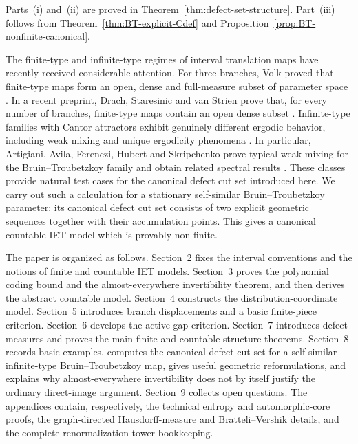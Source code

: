 \documentclass[11pt]{amsart}
\theoremstyle{plain}
\theoremstyle{definition}
\theoremstyle{remark}
\begin{document}
Parts~\textup{(i)} and~\textup{(ii)} are proved in
Theorem~\ref{thm:defect-set-structure}. Part~\textup{(iii)} follows from
Theorem~\ref{thm:BT-explicit-Cdef} and
Proposition~\ref{prop:BT-nonfinite-canonical}.

The finite-type and infinite-type regimes of interval translation maps have recently received
considerable attention. For three branches, Volk proved that finite-type maps form an open,
dense and full-measure subset of parameter space \cite{Volk2014}. In a recent preprint,
Drach, Staresinic and van Strien prove that, for every number of branches, finite-type maps
contain an open dense subset \cite{DrachStaresinicVanStrien2026}. Infinite-type families with
Cantor attractors exhibit genuinely different ergodic behavior, including weak mixing and
unique ergodicity phenomena \cite{BruinRadinger2026,SkripchenkoChernyi2026}. In particular,
Artigiani, Avila, Ferenczi, Hubert and Skripchenko prove typical weak mixing for the
Bruin--Troubetzkoy family and obtain related spectral results
\cite{ArtigianiAvilaFerencziHubertSkripchenko2026}. These classes provide natural test cases
for the canonical defect cut set introduced here. We carry out such a calculation for a
stationary self-similar Bruin--Troubetzkoy parameter: its canonical defect cut set consists of
two explicit geometric sequences together with their accumulation points. This gives a
canonical countable IET model which is provably non-finite.

The paper is organized as follows. Section~2 fixes the interval conventions and the notions
of finite and countable IET models. Section~3 proves the polynomial coding
bound and the almost-everywhere invertibility theorem, and then derives the abstract countable
model. Section~4 constructs the distribution-coordinate model. Section~5 introduces branch
displacements and a basic finite-piece criterion. Section~6 develops the active-gap criterion.
Section~7 introduces defect measures and proves the main finite and countable structure
theorems. Section~8 records basic examples, computes the canonical defect cut set for a
self-similar infinite-type Bruin--Troubetzkoy map, gives useful geometric reformulations,
and explains why almost-everywhere invertibility does not by itself justify the ordinary
direct-image argument. Section~9 collects open questions. The appendices contain,
respectively, the technical entropy and automorphic-core proofs, the graph-directed
Hausdorff-measure and Bratteli--Vershik details, and the complete renormalization-tower
bookkeeping.
\end{document}
